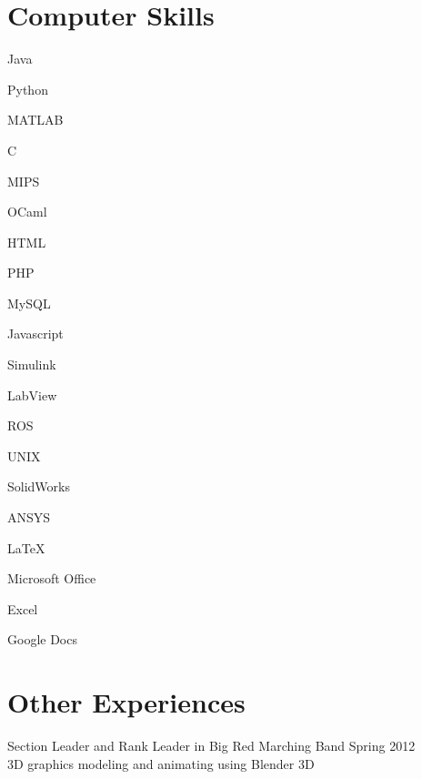 \documentclass{BradyResume}
\begin{document}
\section*{Computer Skills}
\begin{pipelist}[Programming]
    \item Java
    \item Python
    \item MATLAB
    \item C
    \item MIPS
    \item OCaml
    \item HTML
    \item PHP
    \item MySQL
    \item Javascript
    \item Simulink 
    \item LabView
    \item ROS
    \item UNIX
\end{pipelist}

\begin{pipelist}
    \item SolidWorks
    \item ANSYS
\end{pipelist}

\begin{pipelist}[Other]
    \item \LaTeX\ 
    \item Microsoft Office
    \item Excel
    \item Google Docs
\end{pipelist}

\section*{Other Experiences}
Section Leader and Rank Leader in Big Red Marching Band \dotfill Spring 2012\\
3D graphics modeling and animating using Blender 3D
\end{document}
